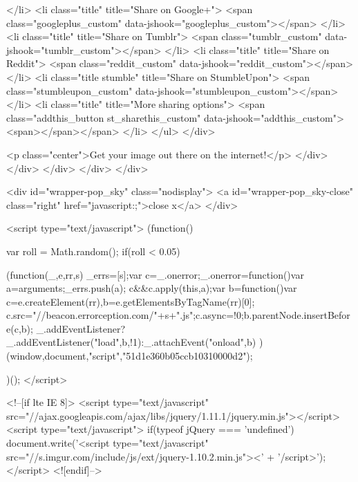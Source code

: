        </li>
        <li class="title" title="Share on Google+">
            <span class="googleplus_custom" data-jshook="googleplus_custom"></span>
        </li>
        <li class="title" title="Share on Tumblr">
            <span class="tumblr_custom" data-jshook="tumblr_custom"></span>
        </li>
        <li class="title" title="Share on Reddit">
            <span class="reddit_custom" data-jshook="reddit_custom"></span>
        </li>
        <li class="title stumble" title="Share on StumbleUpon">
            <span class="stumbleupon_custom" data-jshook="stumbleupon_custom"></span>
        </li>
        <li class="title" title="More sharing options">
            <span class="addthis_button st_sharethis_custom" data-jshook="addthis_custom"><span></span></span>
        </li>
    </ul>
</div>

                    <p class="center">Get your image out there on the internet!</p>
                </div>
            </div>
        </div>
    </div>
</div>
    


            <div id="wrapper-pop_sky" class="nodisplay">
            <a id="wrapper-pop_sky-close" class="right" href="javascript:;">close x</a>
        </div>
    

        

    

    

            
    

    

            <script type="text/javascript">
            (function() {
                var roll = Math.random();
                if(roll < 0.05) {
                    
                    (function(_,e,rr,s){
                        _errs=[s];var c=_.onerror;_.onerror=function(){var a=arguments;_errs.push(a);
                        c&&c.apply(this,a)};var b=function(){var c=e.createElement(rr),b=e.getElementsByTagName(rr)[0];
                        c.src="//beacon.errorception.com/"+s+".js";c.async=!0;b.parentNode.insertBefore(c,b)};
                        _.addEventListener?_.addEventListener("load",b,!1):_.attachEvent("onload",b)
                    })(window,document,"script","51d1e360b05ccb10310000d2");
                    
                }
            })();
        </script>

        
<!--[if lte IE 8]>
<script type="text/javascript" src="//ajax.googleapis.com/ajax/libs/jquery/1.11.1/jquery.min.js"></script>
<script type="text/javascript">
if(typeof jQuery === 'undefined') {
    document.write('<script type="text/javascript" src="//s.imgur.com/include/js/ext/jquery-1.10.2.min.js"><' + '/script>');
}
</script>
<![endif]-->

